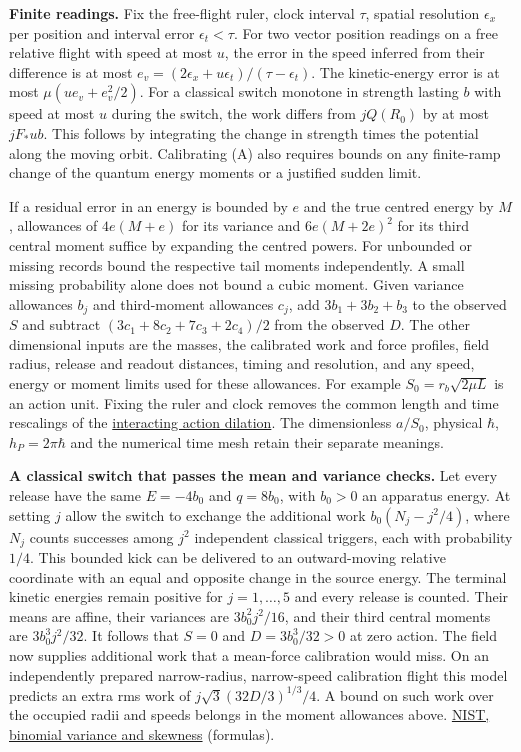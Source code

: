 \documentclass[11pt,a4paper]{article}
\begin{document}
\textbf{Finite readings.} Fix the free-flight ruler, clock interval
\(\tau\), spatial resolution \(\epsilon_x\) per position and interval
error \(\epsilon_t<\tau\). For two vector position readings on a free
relative flight with speed at most \(u\), the error in the speed
inferred from their difference is at most
\(e_v=(2\epsilon_x+u\epsilon_t)/(\tau-\epsilon_t)\). The kinetic-energy
error is at most \(\mu(ue_v+e_v^2/2)\). For a classical switch monotone
in strength lasting \(b\) with speed at most \(u\) during the switch,
the work differs from \(jQ(R_0)\) by at most \(jF_*ub\). This follows by
integrating the change in strength times the potential along the moving
orbit. Calibrating (A) also requires bounds on any finite-ramp change of
the quantum energy moments or a justified sudden limit.

If a residual error in an energy is bounded by \(e\) and the true
centred energy by \(M\), allowances of \(4e(M+e)\) for its variance and
\(6e(M+2e)^2\) for its third central moment suffice by expanding the
centred powers. For unbounded or missing records bound the respective
tail moments independently. A small missing probability alone does not
bound a cubic moment. Given variance allowances \(b_j\) and third-moment
allowances \(c_j\), add \(3b_1+3b_2+b_3\) to the observed \(S\) and
subtract \((3c_1+8c_2+7c_3+2c_4)/2\) from the observed \(D\). The other
dimensional inputs are the masses, the calibrated work and force
profiles, field radius, release and readout distances, timing and
resolution, and any speed, energy or moment limits used for these
allowances. For example \(S_0=r_b\sqrt{2\mu L}\) is an action unit.
Fixing the ruler and clock removes the common length and time rescalings
of the
\href{groupoid-quantum-newton-states.md\#7-interacting-kernels-under-tangent-scaling}{interacting
action dilation}. The dimensionless \(a/S_0\), physical \(\hbar\),
\(h_P=2\pi\hbar\) and the numerical time mesh retain their separate
meanings.

\textbf{A classical switch that passes the mean and variance checks.}
Let every release have the same \(E=-4b_0\) and \(q=8b_0\), with
\(b_0>0\) an apparatus energy. At setting \(j\) allow the switch to
exchange the additional work \(b_0(N_j-j^2/4)\), where \(N_j\) counts
successes among \(j^2\) independent classical triggers, each with
probability \(1/4\). This bounded kick can be delivered to an
outward-moving relative coordinate with an equal and opposite change in
the source energy. The terminal kinetic energies remain positive for
\(j=1,\ldots,5\) and every release is counted. Their means are affine,
their variances are \(3b_0^2j^2/16\), and their third central moments
are \(3b_0^3j^2/32\). It follows that \(S=0\) and \(D=3b_0^3/32>0\) at
zero action. The field now supplies additional work that a mean-force
calibration would miss. On an independently prepared narrow-radius,
narrow-speed calibration flight this model predicts an extra rms work of
\(j\sqrt3(32D/3)^{1/3}/4\). A bound on such work over the occupied radii
and speeds belongs in the moment allowances above.
\href{https://www.itl.nist.gov/div898/handbook/eda/section3/eda366i.htm}{NIST,
binomial variance and skewness} (formulas).
\end{document}
